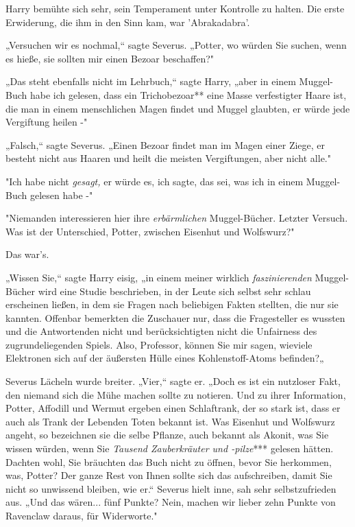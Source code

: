 {Harry bemühte sich sehr, sein Temperament unter Kontrolle zu halten. Die erste Erwiderung, die ihm in den Sinn kam, war 'Abrakadabra'.

„Versuchen wir es nochmal,“ sagte Severus. „Potter, wo würden Sie suchen, wenn es hieße, sie sollten mir einen Bezoar beschaffen?"

„Das steht ebenfalls nicht im Lehrbuch,“ sagte Harry, „aber in einem Muggel-Buch habe ich gelesen, dass ein Trichobezoar** eine Masse verfestigter Haare ist, die man in einem menschlichen Magen findet und Muggel glaubten, er würde jede Vergiftung heilen -"

„Falsch,“ sagte Severus. „Einen Bezoar findet man im Magen einer Ziege, er besteht nicht aus Haaren und heilt die meisten Vergiftungen, aber nicht alle."

"Ich habe nicht \emph{gesagt,} er würde es, ich sagte, das sei, was ich in einem Muggel-Buch gelesen habe -"

"Niemanden interessieren hier ihre \emph{erbärmlichen} Muggel-Bücher. Letzter Versuch. Was ist der Unterschied, Potter, zwischen Eisenhut und Wolfswurz?"

Das war's.

„Wissen Sie,“ sagte Harry eisig, „in einem meiner wirklich \emph{faszinierenden} Muggel-Bücher wird eine Studie beschrieben, in der Leute sich selbst sehr schlau erscheinen ließen, in dem sie Fragen nach beliebigen Fakten stellten, die nur sie kannten. Offenbar bemerkten die Zuschauer nur, dass die Fragesteller es wussten und die Antwortenden nicht und berücksichtigten nicht die Unfairness des zugrundeliegenden Spiels. Also, Professor, können Sie mir sagen, wieviele Elektronen sich auf der äußersten Hülle eines Kohlenstoff-Atoms befinden?„

Severus Lächeln wurde breiter. „Vier,“ sagte er. „Doch es ist ein nutzloser Fakt, den niemand sich die Mühe machen sollte zu notieren. Und zu ihrer Information, Potter, Affodill und Wermut ergeben einen Schlaftrank, der so stark ist, dass er auch als Trank der Lebenden Toten bekannt ist. Was Eisenhut und Wolfswurz angeht, so bezeichnen sie die selbe Pflanze, auch bekannt als Akonit, was Sie wissen würden, wenn Sie \emph{Tausend Zauberkräuter und -pilze}*** gelesen hätten. Dachten wohl, Sie bräuchten das Buch nicht zu öffnen, bevor Sie herkommen, was, Potter? Der ganze Rest von Ihnen sollte sich das aufschreiben, damit Sie nicht so unwissend bleiben, wie er.“ Severus hielt inne, sah sehr selbstzufrieden aus. „Und das wären... fünf Punkte? Nein, machen wir lieber zehn Punkte von Ravenclaw daraus, für Widerworte."

}

